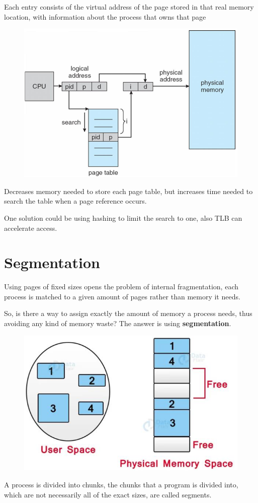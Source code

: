 Each entry consists of the virtual address of the page stored in that real
memory location, with information about the process that owns that
page

\begin{figure}[h!]
    \centering
    \includegraphics[width=0.65\linewidth]{img/sfb.png}
\end{figure}

Decreases memory needed to store each page table, but increases
time needed to search the table when a page reference occurs. 

One solution could be using hashing to limit the search to one, also TLB can accelerate access.
\newpage
\section{Segmentation}
Using pages of fixed sizes opens the problem of internal fragmentation, each process is matched to a given amount of pages rather than
memory it needs.

So, is there a way to assign exactly the amount of memory a process needs, thus avoiding any kind of memory waste? The answer is using \textbf{segmentation}.

\begin{figure}[h!]
    \centering
    \includegraphics[width=0.5\linewidth]{img/sdavg.png}
\end{figure}

A process is divided into chunks, the chunks that a program is divided into, which are not necessarily all
of the exact sizes, are called segments. 

